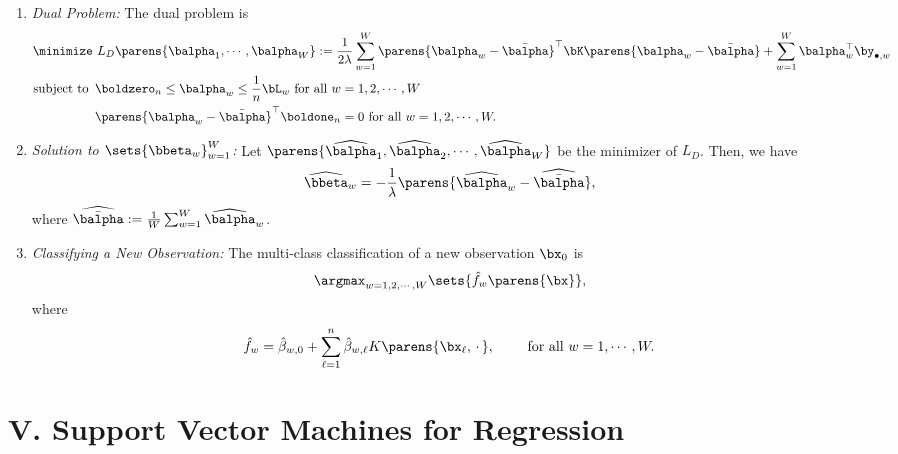 \documentclass[12pt]{article}
\begin{document}
\begin{enumerate}[label=\textbf{\arabic*.}]
\begin{enumerate}
		\item \textit{Dual Problem:} The dual problem is 
		\begin{equation}
			\begin{aligned}
				\minimize & \ L_D \parens{\balpha_1, \cdots, \balpha_W} := \frac{1}{2\lambda} \sum_{w=1}^W \parens{\balpha_w - \bar{\balpha}}^\top \bK \parens{\balpha_w - \bar{\balpha}} + \sum_{w=1}^W \balpha_w^\top \by_{\bullet, w} \\ 
				\text{subject to } & \, \boldzero_n \le \balpha_w \le \frac{1}{n} \bL_w \text{ for all } w = 1, 2, \cdots, W \\ 
				& \, \parens{\balpha_w - \bar{\balpha}}^\top \boldone_n = 0 \text{ for all } w = 1, 2, \cdots, W. 
			\end{aligned}
		\end{equation}
		
		\item \textit{Solution to $\sets{\bbeta_w}_{w=1}^W$:} Let $\parens{\widehat{\balpha}_1, \widehat{\balpha}_2, \cdots, \widehat{\balpha}_W}$ be the minimizer of $L_D$. Then, we have 
		\begin{align*}
			\widehat{\bbeta}_w = - \frac{1}{\lambda} \parens{\widehat{\balpha}_w - \widehat{\bar{\balpha}}}, 
		\end{align*}
		where $\widehat{\bar{\balpha}} := \frac{1}{W} \sum_{w=1}^W \widehat{\balpha}_w$. 
		
		\item \textit{Classifying a New Observation:} The multi-class classification of a new observation $\bx_0$ is 
		\begin{align*}
			\argmax_{w = 1, 2, \cdots, W} \sets{\hat{f}_w \parens{\bx}}, 
		\end{align*}
		where 
		\begin{align*}
			\hat{f}_w = \hat{\beta}_{w,0} + \sum_{\ell=1}^n \hat{\beta}_{w,\ell} K \parens{\bx_{\ell}, \,\cdot\,}, \qquad \text{ for all } w = 1, \cdots, W. 
		\end{align*}
		
	\end{enumerate}

\end{enumerate}


\section*{V. Support Vector Machines for Regression}
\end{document}
